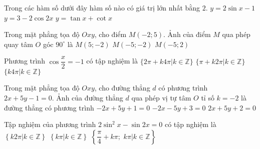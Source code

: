 \begin{ex}%
Trong các hàm số dưới đây hàm số nào có giá trị lớn nhất bằng $2$.
{$y=2\sin x-1$}
{$y=3-2\cos 2x$}
{$y=\tan x+\cot x$}
\end{ex}

\begin{ex}%
Trong mặt phẳng tọa độ $Oxy$, cho điểm $M(-2;5)$. Ảnh của điểm $M$ qua phép quay tâm $O$ góc $90^{\circ}$ là
{$M(5;-2)$}
{\True $M(-5;-2)$}
{$M(-5;2)$}
\loigiai{

}
\end{ex}

\begin{ex}%
Phương trình $\cos \dfrac{x}{2}=-1$ có tập nghiệm là
{\True $\{2\pi+k4\pi|k\in\mathbb{Z}\}$}
{$\{\pi+k2\pi|k\in\mathbb{Z}\}$}
{$\{k4\pi|k\in\mathbb{Z}\}$}
\end{ex}

\begin{ex}%
Trong mặt phẳng tọa độ $Oxy$, cho đường thẳng $d$ có phương trình $2x+5y-1=0$. Ảnh của đường thẳng $d$ qua phép vị tự tâm $O$ tỉ số $k=-2$ là đường thẳng có phương trình
{$-2x+5y+1=0$}
{$-2x-5y+3=0$}
{\True $2x+5y+2=0$}
\end{ex}

\begin{ex}%
Tập nghiệm của phương trình $2\sin^2 x-\sin 2x=0$ có tập nghiệm là
{$\left\{k2\pi|k\in\mathbb{Z}\right\}$}
{$\left\{k\pi|k\in\mathbb{Z}\right\}$}
{\True $\left\{\dfrac{\pi}{4}+k\pi;\,\, k\pi |k\in\mathbb{Z}\right\}$}
\end{ex}

